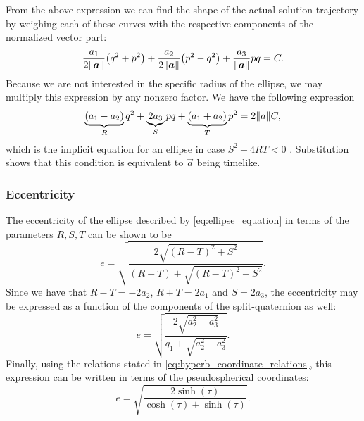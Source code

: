 From the above expression we can find the shape of the actual solution trajectory by weighing each of these curves with the respective components of the normalized vector part:
$$ \frac{a_1}{2\norm{\vec{a}}}\qty(q^2 + p^2)  + \frac{a_2}{2\norm{\vec{a}}}\qty(p^2 - q^2) + \frac{a_3}{\norm{\vec{a}}}pq = C. $$
Because we are not interested in the specific radius of the ellipse, we may multiply this expression by any nonzero factor. We have the following expression 
\begin{equation}
    \underbrace{(a_1 - a_2)}_{R} q^2 + \underbrace{2 a_3}_{S} pq + \underbrace{(a_1 + a_2)}_{T} p^2 = 2\norm{a}C,
    \label{eq:ellipse_equation}
\end{equation}
which is the implicit equation for an ellipse in case $S^2 - 4RT < 0$ \cite{Rapp1991}. Substitution shows that this condition is equivalent to $\vec{a}$ being timelike. 

\subsubsection{Eccentricity} The eccentricity of the ellipse described by \cref{eq:ellipse_equation} in terms of the parameters $R, S, T$ can be shown to be \cite{Rapp1991}
\begin{equation}
    e = \sqrt{\frac{2\sqrt{(R - T)^2 + S^2}}{(R + T) + \sqrt{(R - T)^2 + S^2}}}.
    \label{eq:eccentricity}
\end{equation}
Since we have that $R - T = -2a_2$, $R + T = 2a_1$ and $S = 2a_3$, the eccentricity may be expressed as a function of the components of the split-quaternion as well:
\begin{equation}
    e = \sqrt{\frac{2\sqrt{a_2^2 + a_3^2}}{q_1 + \sqrt{a_2^2 + a_3^2}}}.
\end{equation}
Finally, using the relations stated in \cref{eq:hyperb_coordinate_relations}, this expression can be written in terms of the pseudospherical coordinates:
\begin{equation}
    e = \sqrt{\frac{2\sinh(\tau)}{\cosh(\tau) + \sinh(\tau)}}. 
    \label{eq:e_pseudosphere_coords}
\end{equation}


